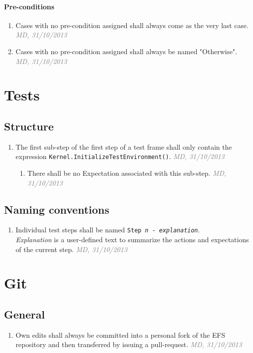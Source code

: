 \documentclass[a4paper, oneside]{scrreprt}
\let\emph\textsl
\newcommand{\code}[1]{\texttt{#1}}
\newcommand{\ruleauthor}[2]{\mbox{}\newline\mbox{}\hfill{\footnotesize\textcolor{gray}{\emph{#1, #2}}}\xspace}
\begin{document}
\subsubsection{Pre-conditions}
\begin{enumerate}
\item Cases with no pre-condition assigned shall always come as the very last case. \ruleauthor{MD}{31/10/2013}
\item Cases with no pre-condition assigned shall always be named "Otherwise". \ruleauthor{MD}{31/10/2013}
\end{enumerate}

\chapter{Tests}

\section{Structure}
\begin{enumerate}
\item The first sub-step of the first step of a test frame shall only contain the expression \code{Kernel.InitializeTestEnvironment()}. \ruleauthor{MD}{31/10/2013}
\begin{enumerate}
\item There shall be no Expectation associated with this sub-step. \ruleauthor{MD}{31/10/2013}
\end{enumerate}
\end{enumerate}


\section{Naming conventions}
\begin{enumerate}
\item Individual test steps shall be named \code{Step \emph{n} - \emph{explanation}}.\\ \emph{Explanation} is a user-defined text to summarize the actions and expectations of the current step. \ruleauthor{MD}{31/10/2013}
\end{enumerate}



\chapter{Git}
\section{General}
\begin{enumerate}
\item Own edits shall always be committed into a personal fork of the EFS repository and then transferred by issuing a pull-request. \ruleauthor{MD}{31/10/2013}
\end{enumerate}
\end{document}
